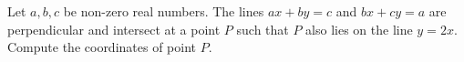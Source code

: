Let $a,b,c$ be non-zero real numbers. The lines $ax + by = c$ and $bx + cy = a$ are perpendicular and intersect at a point $P$ such that $P$ also lies on the line $y=2x$. Compute the coordinates of point $P$.